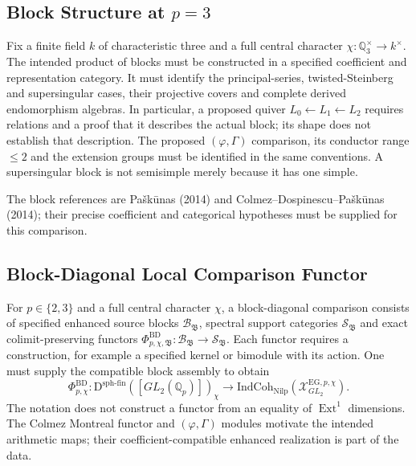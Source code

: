 \subsection{Block Structure at \(p=3\)}

\begin{conjecture}[the small-prime block data at $p=3$]
\label{v4-arith:w5-e:thm:CDP-p3}
Fix a finite field $k$ of characteristic three and a full central character $\chi:\mathbb Q_3^\times\to k^\times$.
The intended product of blocks must be constructed in a specified
coefficient and representation category. It must identify the
principal-series, twisted-Steinberg and supersingular cases, their
projective covers and complete derived endomorphism algebras.
In particular, a proposed quiver $L_0\leftarrow L_1\leftarrow L_2$
requires relations and a proof that it describes the actual block;
its shape does not establish that description. The proposed
$(\varphi,\Gamma)$ comparison, its conductor range $\le2$ and the
extension groups must be identified in the same conventions.
A supersingular block is not semisimple merely because it has one simple.
\end{conjecture}
The block references are Pa\v{s}k\=unas (2014) and Colmez--Dospinescu--Pa\v{s}k\=unas (2014); their precise coefficient and categorical hypotheses must be supplied for this comparison.
\subsection{Block-Diagonal Local Comparison Functor}

\begin{definition}
\label{v4-arith:w5-e:def:block-diagonal}
For $p\in\{2,3\}$ and a full central character $\chi$, a
block-diagonal comparison consists of specified enhanced source blocks
$\mathcal B_{\mathfrak B}$, spectral support categories
$\mathcal S_{\mathfrak B}$ and exact colimit-preserving functors
$\Phi^{\mathrm{BD}}_{p,\chi,\mathfrak B}:\mathcal B_{\mathfrak B}
\to\mathcal S_{\mathfrak B}$. Each functor requires a construction,
for example a specified kernel or bimodule with its action.
One must supply the compatible block assembly to obtain
\[
 \Phi^{\mathrm{BD}}_{p,\chi}:
 \mathrm D^{\mathrm{sph\text{-}fin}}([GL_2(\mathbb Q_p)])_\chi
 \longrightarrow\mathrm{IndCoh}_{\mathrm{Nilp}}
 (\mathcal X^{\mathrm{EG},p,\chi}_{GL_2}).
\]
The notation does not construct a functor from an equality of
$\operatorname{Ext}^1$ dimensions. The Colmez Montreal functor and
$(\varphi,\Gamma)$ modules motivate the intended arithmetic maps;
their coefficient-compatible enhanced realization is part of the data.
\end{definition}

